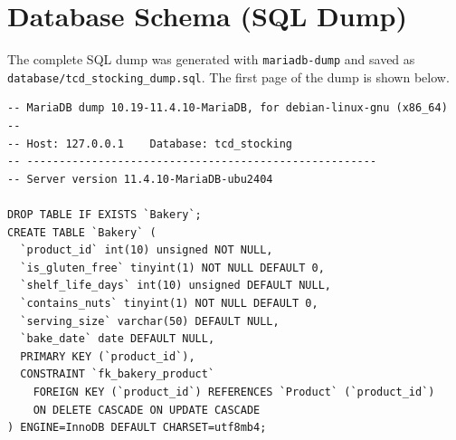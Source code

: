 \section{Database Schema (SQL Dump)}

The complete SQL dump was generated with \texttt{mariadb-dump} and saved as \\
\texttt{database/tcd\_stocking\_dump.sql}. The first page of the dump is shown below.

{\scriptsize
\begin{verbatim}
-- MariaDB dump 10.19-11.4.10-MariaDB, for debian-linux-gnu (x86_64)
--
-- Host: 127.0.0.1    Database: tcd_stocking
-- ------------------------------------------------------
-- Server version 11.4.10-MariaDB-ubu2404

DROP TABLE IF EXISTS `Bakery`;
CREATE TABLE `Bakery` (
  `product_id` int(10) unsigned NOT NULL,
  `is_gluten_free` tinyint(1) NOT NULL DEFAULT 0,
  `shelf_life_days` int(10) unsigned DEFAULT NULL,
  `contains_nuts` tinyint(1) NOT NULL DEFAULT 0,
  `serving_size` varchar(50) DEFAULT NULL,
  `bake_date` date DEFAULT NULL,
  PRIMARY KEY (`product_id`),
  CONSTRAINT `fk_bakery_product`
    FOREIGN KEY (`product_id`) REFERENCES `Product` (`product_id`)
    ON DELETE CASCADE ON UPDATE CASCADE
) ENGINE=InnoDB DEFAULT CHARSET=utf8mb4;
\end{verbatim}
}
